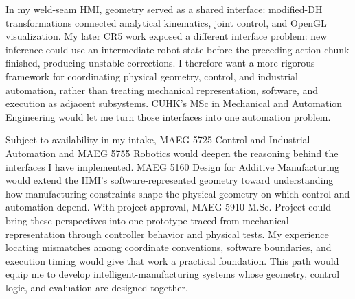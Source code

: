 In my weld-seam HMI, geometry served as a shared interface: modified-DH transformations connected analytical kinematics, joint control, and OpenGL visualization. My later CR5 work exposed a different interface problem: new inference could use an intermediate robot state before the preceding action chunk finished, producing unstable corrections. I therefore want a more rigorous framework for coordinating physical geometry, control, and industrial automation, rather than treating mechanical representation, software, and execution as adjacent subsystems. CUHK's MSc in Mechanical and Automation Engineering would let me turn those interfaces into one automation problem.

Subject to availability in my intake, MAEG 5725 Control and Industrial Automation and MAEG 5755 Robotics would deepen the reasoning behind the interfaces I have implemented. MAEG 5160 Design for Additive Manufacturing would extend the HMI's software-represented geometry toward understanding how manufacturing constraints shape the physical geometry on which control and automation depend. With project approval, MAEG 5910 M.Sc. Project could bring these perspectives into one prototype traced from mechanical representation through controller behavior and physical tests. My experience locating mismatches among coordinate conventions, software boundaries, and execution timing would give that work a practical foundation. This path would equip me to develop intelligent-manufacturing systems whose geometry, control logic, and evaluation are designed together.

